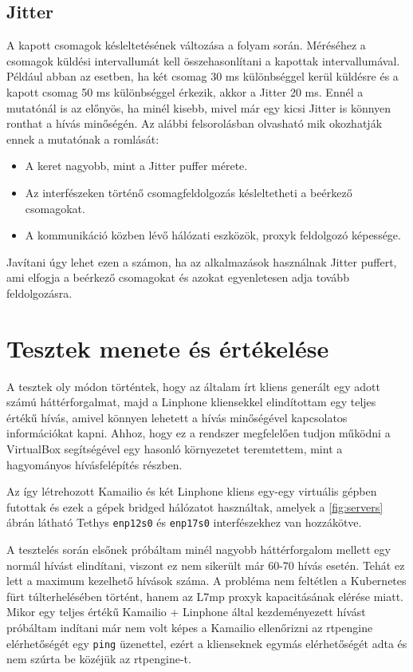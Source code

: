 \subsection{Jitter}

A kapott csomagok késleltetésének változása a folyam során. Méréséhez a csomagok küldési 
intervallumát kell összehasonlítani a kapottak intervallumával. Például abban az esetben, 
ha két csomag 30 ms különbséggel kerül küldésre és a kapott csomag 50 ms különbséggel 
érkezik, akkor a Jitter 20 ms. Ennél a mutatónál is az előnyös, ha minél kisebb, mivel 
már egy kicsi Jitter is könnyen ronthat a hívás minőségén. Az alábbi felsorolásban 
olvasható mik okozhatják ennek a mutatónak a romlását:

\begin{itemize}
	\item A keret nagyobb, mint a Jitter puffer mérete. 
	\item Az interfészeken történő csomagfeldolgozás késleltetheti a beérkező csomagokat.
	\item A kommunikáció közben lévő hálózati eszközök, proxyk feldolgozó képessége. 
\end{itemize}

Javítani úgy lehet ezen a számon, ha az alkalmazások használnak Jitter puffert, ami 
elfogja a beérkező csomagokat és azokat egyenletesen adja tovább feldolgozásra. 

\section{Tesztek menete és értékelése}

A tesztek oly módon történtek, hogy az általam írt kliens generált egy adott számú 
háttérforgalmat, majd a Linphone kliensekkel elindítottam egy teljes értékű hívás, amivel 
könnyen lehetett a hívás minőségével kapcsolatos információkat kapni. Ahhoz, hogy ez a 
rendszer megfelelően tudjon működni a VirtualBox segítségével egy hasonló környezetet 
teremtettem, mint a hagyományos hívásfelépítés részben.

Az így létrehozott Kamailio és két Linphone kliens egy-egy virtuális gépben futottak és 
ezek a gépek bridged hálózatot használtak, amelyek a \ref{fig:servers} ábrán látható 
Tethys \texttt{enp12s0} és \texttt{enp17s0} interfészekhez van hozzákötve. 

A tesztelés során elsőnek próbáltam minél nagyobb háttérforgalom mellett egy normál 
hívást elindítani, viszont ez nem sikerült már 60-70 hívás esetén. Tehát ez lett a 
maximum kezelhető hívások száma. A probléma nem feltétlen a Kubernetes fürt 
túlterhelésében történt, hanem az L7mp proxyk kapacitásának elérése miatt. Mikor egy 
teljes értékű Kamailio + Linphone által kezdeményezett hívást próbáltam indítani már nem 
volt képes a Kamailio ellenőrizni az rtpengine elérhetőségét egy \texttt{ping} üzenettel, 
ezért a klienseknek egymás elérhetőségét adta és nem szúrta be közéjük az rtpengine-t.

